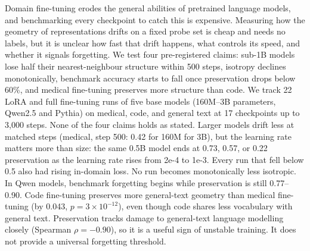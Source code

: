 Domain fine-tuning erodes the general abilities of pretrained language models, and benchmarking every checkpoint to catch this is expensive. Measuring how the geometry of representations drifts on a fixed probe set is cheap and needs no labels, but it is unclear how fast that drift happens, what controls its speed, and whether it signals forgetting. We test four pre-registered claims: sub-1B models lose half their nearest-neighbour structure within 500 steps, isotropy declines monotonically, benchmark accuracy starts to fall once preservation drops below 60\%, and medical fine-tuning preserves more structure than code. We track 22 LoRA and full fine-tuning runs of five base models (160M--3B parameters, Qwen2.5 and Pythia) on medical, code, and general text at 17 checkpoints up to 3,000 steps. None of the four claims holds as stated. Larger models drift less at matched steps (medical, step 500: 0.42 for 160M  for 3B), but the learning rate matters more than size: the same 0.5B model ends at 0.73, 0.57, or 0.22 preservation as the learning rate rises from 2e-4 to 1e-3. Every run that fell below 0.5 also had rising in-domain loss. No run becomes monotonically less isotropic. In Qwen models, benchmark forgetting begins while preservation is still 0.77--0.90. Code fine-tuning preserves more general-text geometry than medical fine-tuning (by 0.043, $p=3\times10^{-12}$), even though code shares less vocabulary with general text. Preservation tracks damage to general-text language modelling closely (Spearman $\rho=-0.90$), so it is a useful sign of unstable training. It does not provide a universal forgetting threshold.
